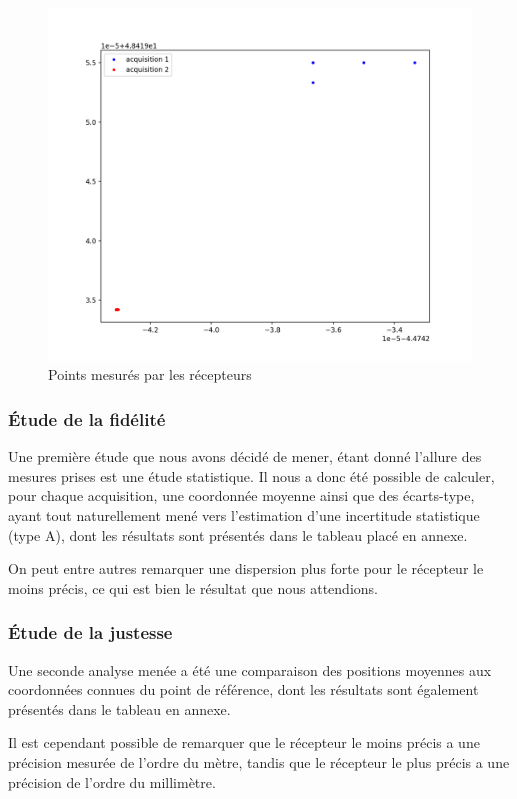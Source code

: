       \begin{figure}[h]
          \centering
          \includegraphics[width=.8\textwidth]{imgs/fidélité}
          \caption{Points mesurés par les récepteurs}
          \label{fig:fidel}
      \end{figure}

      \subsubsection{Étude de la fidélité}
         Une première étude que nous avons décidé de mener, étant donné l'allure des mesures prises est une étude statistique.
         Il nous a donc été possible de calculer, pour chaque acquisition, une coordonnée moyenne ainsi que des écarts-type, ayant tout naturellement mené vers l'estimation d'une incertitude statistique (type A), dont les résultats sont présentés dans le tableau placé en annexe.

         On peut entre autres remarquer une dispersion plus forte pour le récepteur le moins précis, ce qui est bien le résultat que nous attendions.

      \subsubsection{Étude de la justesse}
         Une seconde analyse menée a été une comparaison des positions moyennes aux coordonnées connues du point de référence, dont les résultats sont également présentés dans le tableau en annexe.

         Il est cependant possible de remarquer que le récepteur le moins précis a une précision mesurée de l'ordre du mètre, tandis que le récepteur le plus précis a une précision de l'ordre du millimètre.

